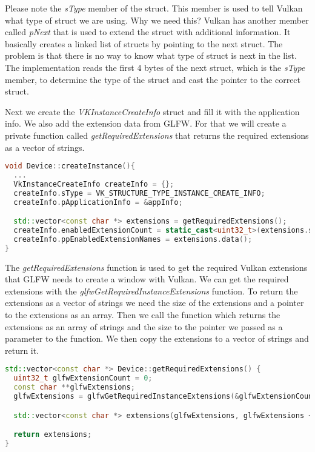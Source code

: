 \documentclass[12pt]{report} \usepackage{preamble}
\begin{document}
Please note the \textit{sType} member of the struct. This member is used to tell Vulkan
what type of struct we are using. Why we need this? Vulkan has another member called
\textit{pNext} that is used to extend the struct with additional information. It basically
creates a linked list of structs by pointing to the next struct. The problem is that there is
no way to know what type of struct is next in the list. The implementation reads the first 4 bytes
of the next struct, which is the \textit{sType} member, to determine the type of the struct and
cast the pointer to the correct struct.

Next we create the \textit{VKInstanceCreateInfo} struct and fill it with the application info.
We also add the extension data from \ac{GLFW}.
For that we will create a private function called \textit{getRequiredExtensions} that returns
the required extensions as a vector of strings.

\begin{lstlisting}[language=C++]
void Device::createInstance(){
  ...
  VkInstanceCreateInfo createInfo = {};
  createInfo.sType = VK_STRUCTURE_TYPE_INSTANCE_CREATE_INFO;
  createInfo.pApplicationInfo = &appInfo;

  std::vector<const char *> extensions = getRequiredExtensions();
  createInfo.enabledExtensionCount = static_cast<uint32_t>(extensions.size());
  createInfo.ppEnabledExtensionNames = extensions.data();
}
\end{lstlisting}

The \textit{getRequiredExtensions} function is used to get the required Vulkan extensions
that \ac{GLFW} needs to create a window with Vulkan. We can get the required extensions with the
\textit{glfwGetRequiredInstanceExtensions} function. To return the extensions as a vector of strings
we need the size of the extensions and a pointer to the extensions as an array. Then we call the function
which returns the extensions as an array of strings and the size
to the pointer we passed as a parameter to the function. We then copy the extensions to a vector of strings
and return it.

\begin{lstlisting}[language=C++]
std::vector<const char *> Device::getRequiredExtensions() {
  uint32_t glfwExtensionCount = 0;
  const char **glfwExtensions;
  glfwExtensions = glfwGetRequiredInstanceExtensions(&glfwExtensionCount);

  std::vector<const char *> extensions(glfwExtensions, glfwExtensions + glfwExtensionCount);

  return extensions;
}
\end{lstlisting}
\end{document}

